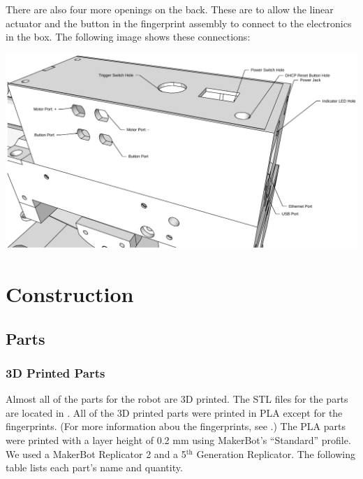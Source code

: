 \documentclass[letterpaper,10pt,english]{sphinxmanual}
\begin{document}
There are also four more openings on the back. These are to allow the linear actuator and the button in the fingerprint assembly to connect to the electronics in the box. The following image shows these connections:

\includegraphics{ElectronicsHousingBack.pdf}


\section{Construction}
\label{NARFSTR:construction}

\subsection{Parts}
\label{NARFSTR:parts}

\subsubsection{3D Printed Parts}
\label{NARFSTR:d-printed-parts}
Almost all of the parts for the robot are 3D printed. The STL files for the parts are located in . All of the 3D printed parts were printed in PLA except for the fingerprints. (For more information abou the fingerprints, see {\hyperref[NARFSTR:fingerprintsection]{\emph{}}}.) The PLA parts were printed with a layer height of 0.2 mm using MakerBot's ``Standard'' profile. We used a MakerBot Replicator 2 and a  5$^{\text{th}}$ Generation Replicator. The following table lists each part's name and quantity.
\end{document}
